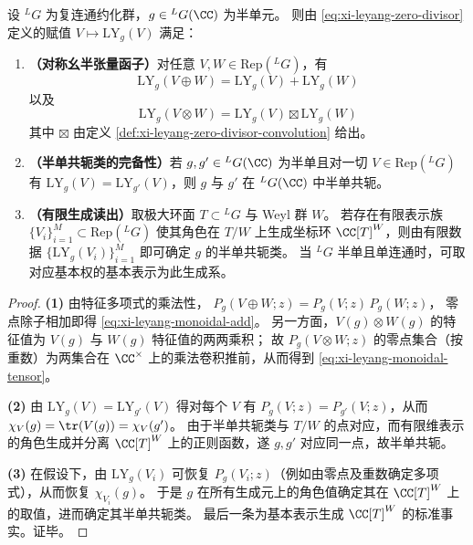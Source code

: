 \begin{theorem}\label{thm:xi-leyang-zero-divisor-tensor-functor-faithful}
设 \({}^{L}G\) 为复连通约化群，\(g\in{}^{L}G(\CC)\) 为半单元。
则由 \eqref{eq:xi-leyang-zero-divisor} 定义的赋值 \(V\mapsto \mathrm{LY}_g(V)\) 满足：
\begin{enumerate}
  \item \textbf{（对称幺半张量函子）}对任意 \(V,W\in\mathrm{Rep}({}^{L}G)\)，有
  \begin{equation}\label{eq:xi-leyang-monoidal-add}
  \boxed{\;
  \mathrm{LY}_g(V\oplus W)=\mathrm{LY}_g(V)+\mathrm{LY}_g(W)\;}
  \end{equation}
  以及
  \begin{equation}\label{eq:xi-leyang-monoidal-tensor}
  \boxed{\;
  \mathrm{LY}_g(V\otimes W)=\mathrm{LY}_g(V)\boxtimes \mathrm{LY}_g(W)\;}
  \end{equation}
  其中 \(\boxtimes\) 由定义 \ref{def:xi-leyang-zero-divisor-convolution} 给出。
  \item \textbf{（半单共轭类的完备性）}若 \(g,g'\in{}^{L}G(\CC)\) 为半单且对一切 \(V\in\mathrm{Rep}({}^{L}G)\) 有 \(\mathrm{LY}_g(V)=\mathrm{LY}_{g'}(V)\)，则 \(g\) 与 \(g'\) 在 \({}^{L}G(\CC)\) 中半单共轭。
  \item \textbf{（有限生成读出）}取极大环面 \(T\subset {}^{L}G\) 与 Weyl 群 \(W\)。
  若存在有限表示族 \(\{V_i\}_{i=1}^{M}\subset\mathrm{Rep}({}^{L}G)\) 使其角色在 \(T/W\) 上生成坐标环 \(\CC[T]^W\)，则由有限数据 \(\{\mathrm{LY}_g(V_i)\}_{i=1}^{M}\) 即可确定 \(g\) 的半单共轭类。
  当 \({}^{L}G\) 半单且单连通时，可取对应基本权的基本表示为此生成系。
\end{enumerate}
\end{theorem}
\begin{proof}
\textbf{(1)} 由特征多项式的乘法性，
\(
P_g(V\oplus W;z)=P_g(V;z)\,P_g(W;z)
\)，
零点除子相加即得 \eqref{eq:xi-leyang-monoidal-add}。
另一方面，\(V(g)\otimes W(g)\) 的特征值为 \(V(g)\) 与 \(W(g)\) 特征值的两两乘积；
故 \(P_g(V\otimes W;z)\) 的零点集合（按重数）为两集合在 \(\CC^{\times}\) 上的乘法卷积推前，从而得到 \eqref{eq:xi-leyang-monoidal-tensor}。
\par
\textbf{(2)} 由 \(\mathrm{LY}_g(V)=\mathrm{LY}_{g'}(V)\) 得对每个 \(V\) 有 \(P_g(V;z)=P_{g'}(V;z)\)，从而 \(\chi_V(g)=\tr(V(g))=\chi_V(g')\)。
由于半单共轭类与 \(T/W\) 的点对应，而有限维表示的角色生成并分离 \(\CC[T]^W\) 上的正则函数，遂 \(g,g'\) 对应同一点，故半单共轭。
\par
\textbf{(3)} 在假设下，由 \(\mathrm{LY}_g(V_i)\) 可恢复 \(P_g(V_i;z)\)（例如由零点及重数确定多项式），从而恢复 \(\chi_{V_i}(g)\)。
于是 \(g\) 在所有生成元上的角色值确定其在 \(\CC[T]^W\) 上的取值，进而确定其半单共轭类。
最后一条为基本表示生成 \(\CC[T]^W\) 的标准事实。证毕。
\end{proof}

